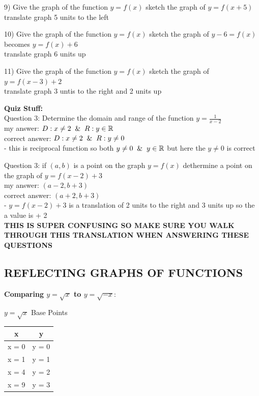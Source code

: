 \documentclass[10pt]{article}
\begin{document}
9) Give the graph of the  function \(y = f(x)\) sketch the graph of  \(y = f(x + 5)\) \\
\hspace*{1em} translate graph 5 units to the left


10) Give the graph of the  function \(y = f(x)\) sketch the graph of  \(y - 6 = f(x)\) \\
\hspace*{1em}  becomes \(y = f(x) + 6\)\\
\hspace*{1em} translate graph 6 units up


11) Give the graph of the  function \(y = f(x)\) sketch the graph of  \(y = f(x-3) + 2\) \\
\hspace*{1em} translate graph 3 untis to the right and 2 units up

\textbf{Quiz Stuff:} \\
Question 3: Determine the domain and range of the function \(y = \frac{1}{x-2}\) \\
my answer: \(D: x \neq 2 \And R: y  \in \mathbb{R} \) \\
correct answer: \(D: x \neq 2 \And R: y  \neq 0 \) \\
- this is reciprocal function so both \(y \neq 0 \And y \in \mathbb{R} \) but here the \(y  \neq 0 \) is correct


Question 3: if \((a, b)\) is a point on the graph \(y = f(x)\) dethermine a point on the graph of \(y = f(x - 2) + 3\) \\
my answer: \((a - 2, b + 3) \) \\
correct answer: \((a + 2, b + 3) \) \\
- \(y = f(x - 2) + 3\) is a translation of 2 units to the right and 3 units up so the a value is + 2 \\
\textbf{THIS IS SUPER CONFUSING SO MAKE SURE YOU WALK THROUGH THIS TRANSLATION WHEN ANSWERING THESE QUESTIONS}



\clearpage

\subsection{REFLECTING GRAPHS OF FUNCTIONS}


\textbf{Comparing \(y = \sqrt{x}\) to \(y = \sqrt{-x}\)}:


\(y = \sqrt{x}\) Base Points \\
\begin{tabular}{|c|c|}
    \hline
    x     & y     \\
    \hline
    x = 0 & y = 0 \\
    x = 1 & y = 1 \\
    x = 4 & y = 2 \\
    x = 9 & y = 3 \\
    \hline
\end{tabular}
\end{document}
